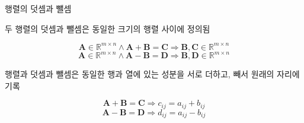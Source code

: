 \begin{frame}{행렬의 덧셈과 뺄셈}

두 행렬의 덧셈과 뺄셈은 동일한 크기의 행렬 사이에 정의됨

$$\mathbf A \in \mathbb R^{m \times n}  \wedge \mathbf A + \mathbf B = \mathbf C \Rightarrow \mathbf B, \mathbf C \in \mathbb R^{m \times n}$$
$$\mathbf A \in \mathbb R^{m \times n}  \wedge \mathbf A - \mathbf B = \mathbf D \Rightarrow \mathbf B, \mathbf D \in \mathbb R^{m \times n}$$

행렬과 덧셈과 뺄셈은 동일한 행과 열에 있는 성분을 서로 더하고, 빼서 원래의 자리에 기록

$$\mathbf A + \mathbf B = \mathbf C \Rightarrow c_{ij} = a_{ij} + b_{ij}$$
$$\mathbf A - \mathbf B = \mathbf D \Rightarrow d_{ij} = a_{ij} - b_{ij}$$

\end{frame}

